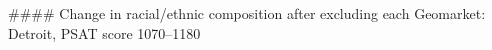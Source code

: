 #### Change in racial/ethnic composition after excluding each Geomarket: Detroit, PSAT score 1070–1180
